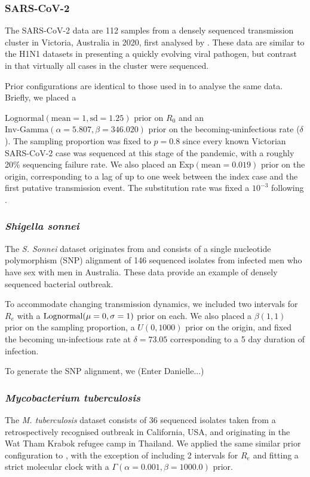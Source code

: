 \documentclass{article}
\begin{document}
\begin{spacing}{1.5}
\subsubsection*{SARS-CoV-2}
The SARS-CoV-2 data are 112 samples from a densely sequenced transmission cluster in Victoria, Australia in 2020, first analysed by \citet{lane2021genomics}. These data are similar to the H1N1 datasets in presenting a quickly evolving viral pathogen, but contrast in that virtually all cases in the cluster were sequenced. 

Prior configurations are identical to those used in \citet{featherstone_decoding_2023} to analyse the same data. Briefly, we placed a 

$\textrm{Lognormal}(\textrm{mean}=1, \textrm{sd}=1.25)$ prior on $R_0$ and an $\textrm{Inv-Gamma}(\alpha=5.807, \beta=346.020)$ prior on the becoming-uninfectious rate ($\delta$).  The sampling proportion was fixed to $p=0.8$ since every known Victorian SARS-CoV-2 case was sequenced at this stage of the pandemic, with a roughly 20\% sequencing failure rate. We also placed an $\textrm{Exp}(\textrm{mean}=0.019)$ prior on the origin, corresponding to a lag of up to one week  between the index case and the first putative transmission event. The substitution rate was fixed a $10^{-3}$ following \citep{duchene_temporal_2020}.

\subsubsection*{\textit{Shigella sonnei}}
The \textit{S. Sonnei} dataset originates from \citet{ingle_co-circulation_2019} and consists of a single nucleotide polymorphism (SNP) alignment of 146 sequenced isolates from infected men who have sex with men in Australia. These data provide an example of densely sequenced bacterial outbreak. 

To accommodate changing transmission dynamics, we included two intervals for $R_e$ with a $\textnormal{Lognormal}(\mu=0,\sigma=1)$ prior on each. We also placed a $\beta(1,1)$ prior on the sampling proportion, a $U(0,1000)$ prior on the origin, and fixed the becoming un-infectious rate at $\delta=73.05$ corresponding to a 5 day duration of infection.

To generate the SNP alignment, we (Enter Danielle...)

\subsubsection*{\textit{Mycobacterium tuberculosis}}
The \textit{M. tuberculosis} dataset consists of 36 sequenced isolates taken from a retrospectively recognised outbreak in California, USA, and originating in the Wat Tham Krabok refugee camp in Thailand. We applied the same similar prior configuration to \citet{kuhnert_tuberculosis_2018}, with the exception of including 2 intervals for $R_e$ and fitting a strict molecular clock with a $\Gamma(\alpha=0.001,\beta=1000.0)$ prior.



\end{spacing}
\end{document}
